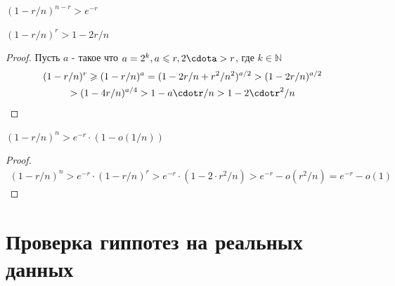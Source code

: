 \documentclass[times,specification,annotation]{itmo-student-thesis}
\begin{document}
    \begin{lemma}
        \label{exp:greater}
        $(1 - r/n)^{n - r} > e^{-r}$
    \end{lemma}

    \begin{lemma}
        \label{exp:greater2}
        $(1 - r/n)^r > 1 - 2r/n$
    \end{lemma}
    \begin{proof}
        Пусть $a$ - такое что $a = 2^k, a \leq r, 2\cdota > r$, где $k \in \mathbb {N}$ \\
        \begin{gather*}
            (1 - r/n)^r \geq (1 - r/n)^a = (1 - 2r/n + r^2/n^2)^{a/2} > (1 - 2r/n)^{a/2} \\
            > (1 - 4r/n)^{a/4} > 1 - a\cdotr/n > 1 - 2\cdotr^2/n
        \end{gather*}
    \end{proof}

    \begin{lemma}
        \label{exp:greaterO}
        $(1 - r/n)^n > e^{-r} \cdot (1 - o(1/n))$
    \end{lemma}
    \begin{proof}
        \begin{gather*}
            (1 - r/n)^n > e^{-r} \cdot (1 - r/n)^r > e^{-r} \cdot (1 - 2 \cdot r^2/n) > e^{-r} - o(r^2/n) = e^{-r} - o(1)
        \end{gather*}
    \end{proof}


    \chapter{Проверка гиппотез на реальных данных}\label{ch:проверка-гиппотез-на-реальных-данных}
\end{document}

